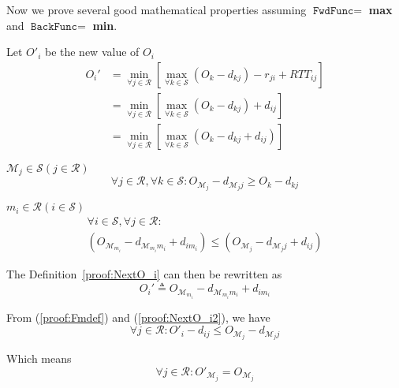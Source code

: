 Now we prove several good mathematical properties assuming $\texttt{FwdFunc} =$ \textbf{max} and $\texttt{BackFunc} =$ \textbf{min}.
\theoremstyle{definition}
\begin{definition}{Let $O'_i$ be the new value of $O_i$}\label{proof:NextO_i}
\begin{equation*}
\begin{aligned}
O_i' &= \min\limits_{\forall j \in \mathcal{R}}\left[\max\limits_{\forall k \in \mathcal{S}}\left(O_k - d_{kj}\right) - r_{ji} + RTT_{ij}\right] \\
     &= \min\limits_{\forall j \in \mathcal{R}}\left[\max\limits_{\forall k \in \mathcal{S}}\left(O_k - d_{kj}\right) + d_{ij}\right] \\
     &=\min_{\forall  j \in \mathcal{R}}\left[\max_{\forall k \in \mathcal{S}}\left(O_k - d_{kj} + d_{ij}\right)\right]
\end{aligned}
\end{equation*}
\end{definition}
\newcommand{\FM}[1]{{\mathcal{M}_{#1}}}
\newcommand{\FMGEN}[2]{{O_{#1}-d_{{#1}{#2}}}}
\newcommand{\Fm}[1]{{m_{#1}}}
\newcommand{\FmGEN}[2]{\FMGEN{\FM{#1}}{#1}+ d_{{#2}{#1}}}
\newcommand{\NEXTT}[1]{{\FmGEN{\Fm{#1}}{#1}}}
\begin{definition} $\FM{j} \in \mathcal{S} (j \in \mathcal{R})$
\begin{equation} \label{proof:FMdef}
\forall j \in \mathcal{R}, \forall k \in \mathcal{S}:\FMGEN{\FM{j}}{j} \ge \FMGEN{k}{j}
\end{equation}
\end{definition}
\begin{definition} $\Fm{i} \in \mathcal{R} (i \in \mathcal{S})$
\begin{multline} \label{proof:Fmdef}
\forall i \in \mathcal{S}, \forall j \in \mathcal{R}:\\
(\FmGEN{\Fm{i}}{i}) \le (\FmGEN{j}{i})
\end{multline}
\end{definition}
\begin{note}
	The Definition~\ref{proof:NextO_i} can then be rewritten as
	\begin{equation}\label{proof:NextO_i2}
	O_i' \triangleq \NEXTT{i}
	\end{equation}
\end{note}
\begin{note}
	From (\ref{proof:Fmdef}) and (\ref{proof:NextO_i2}), we have
	\begin{equation}\label{proof:FMnewOle}
		\forall j \in \mathcal{R} : O'_i - d_{ij} \le \FMGEN{\FM{j}}{j}
	\end{equation}
	
	Which means
	\begin{equation}\label{proof:unchanged_FM}
		\forall j \in \mathcal{R}:O'_{\FM{j}} = O_{\FM{j}}
	\end{equation}
\end{note}
